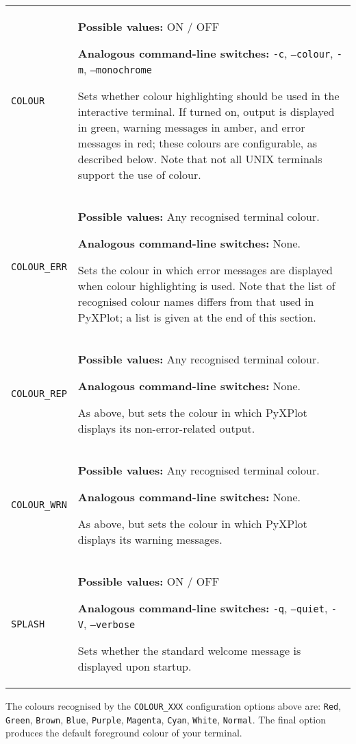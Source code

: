 \begin{longtable}{p{3.4cm}p{9cm}}
{\tt COLOUR} & {\bf Possible values:} ON / OFF

                  {\bf Analogous command-line switches:} {\tt -c}, {\tt --colour}, {\tt -m}, {\tt --monochrome}

                  Sets whether colour highlighting should be used in the interactive terminal. If turned on, output is displayed in green, warning messages in amber, and error messages in red; these colours are configurable, as described below. Note that not all UNIX terminals support the use of colour.
                   \\
{\tt COLOUR\_ERR} & {\bf Possible values:} Any recognised terminal colour.

                  {\bf Analogous command-line switches:} None.

                  Sets the colour in which error messages are displayed when colour highlighting is used. Note that the list of recognised colour names differs from that used in PyXPlot; a list is given at the end of this section.
                   \\
{\tt COLOUR\_REP} & {\bf Possible values:} Any recognised terminal colour.

                  {\bf Analogous command-line switches:} None.

                  As above, but sets the colour in which PyXPlot displays its non-error-related output.
                   \\
{\tt COLOUR\_WRN} & {\bf Possible values:} Any recognised terminal colour.

                  {\bf Analogous command-line switches:} None.

                  As above, but sets the colour in which PyXPlot displays its warning messages.
                   \\
{\tt SPLASH} & {\bf Possible values:} ON / OFF

                  {\bf Analogous command-line switches:} {\tt -q}, {\tt --quiet}, {\tt -V}, {\tt --verbose}

                  Sets whether the standard welcome message is displayed upon startup.
                   \\
\end{longtable}

The colours recognised by the {\tt COLOUR\_XXX} configuration options above are: {\tt Red}, {\tt Green}, {\tt Brown}, {\tt Blue}, {\tt Purple}, {\tt Magenta}, {\tt Cyan}, {\tt White}, {\tt Normal}. The final option produces the default foreground colour of your terminal.

